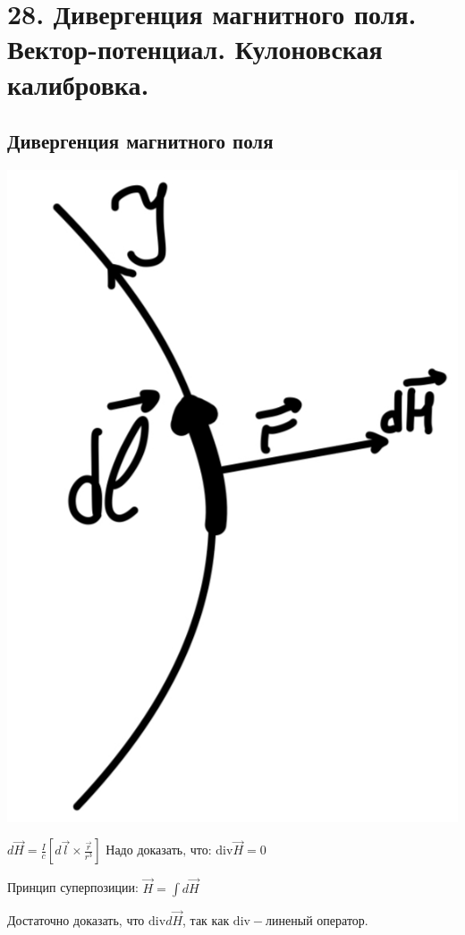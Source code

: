 \section*{28. Дивергенция магнитного поля. Вектор-потенциал. Кулоновская
калибровка.}
 
\subsection*{Дивергенция магнитного поля}

\noindent
\begin{minipage}[c]{0.2\textwidth} %
    \includegraphics[width=\textwidth]{im/62.png}{} %
\end{minipage}%
\hfill
\begin{minipage}[c]{0.68\textwidth} %
    
    \( d\vec{H}=\frac{I}{c}\left[ d\vec{l}\times \frac{\vec{r}}{r^3}  \right] \text{ Надо доказать, что: }\mathrm{div} \vec{H}=0 \)
    
    Принцип суперпозиции: $\vec{H}=\int d\vec{H}$
    
    Достаточно доказать, что $\mathrm{div} d\vec{H}$, так как $\mathrm{div}-$линеный оператор. 
\end{minipage}

